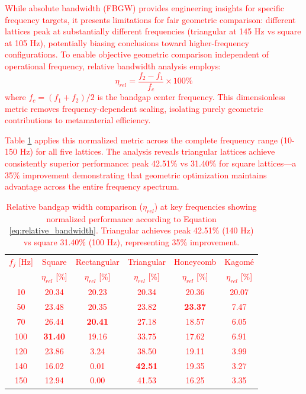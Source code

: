 \documentclass[review,numbers,sort&compress]{elsarticle}
\begin{document}
\textcolor{red}{While absolute bandwidth (FBGW) provides engineering insights for specific frequency targets, it presents limitations for fair geometric comparison: different lattices peak at substantially different frequencies (triangular at 145 Hz vs square at 105 Hz), potentially biasing conclusions toward higher-frequency configurations. To enable objective geometric comparison independent of operational frequency, relative bandwidth analysis employs:
\begin{equation}
\eta_{rel} = \frac{f_2 - f_1}{f_c} \times 100\%
\label{eq:relative_bandwidth}
\end{equation}
where $f_c = (f_1 + f_2)/2$ is the bandgap center frequency. This dimensionless metric removes frequency-dependent scaling, isolating purely geometric contributions to metamaterial efficiency.}

\textcolor{red}{Table \ref{tab:relative_bandwidth_comparison} applies this normalized metric across the complete frequency range (10-150 Hz) for all five lattices. The analysis reveals triangular lattices achieve consistently superior performance: peak 42.51\% vs 31.40\% for square lattices—a 35\% improvement demonstrating that geometric optimization maintains advantage across the entire frequency spectrum.}

\begin{table}[htb]
\centering
\caption{\textcolor{red}{Relative bandgap width comparison ($\eta_{rel}$) at key frequencies showing normalized performance according to Equation \ref{eq:relative_bandwidth}. Triangular achieves peak 42.51\% (140 Hz) vs square 31.40\% (100 Hz), representing 35\% improvement.}}
\label{tab:relative_bandwidth_comparison}
\textcolor{red}{
\footnotesize
\begin{tabular}{cccccc}
\hline
$f_j$ [Hz] & Square & Rectangular & Triangular & Honeycomb & Kagomé \\
& $\eta_{rel}$ [\%] & $\eta_{rel}$ [\%] & $\eta_{rel}$ [\%] & $\eta_{rel}$ [\%] & $\eta_{rel}$ [\%] \\
\hline
10 & 20.34 & 20.23 & 20.34 & 20.36 & 20.07 \\
50 & 23.48 & 20.35 & 23.82 & \textbf{23.37} & 7.47 \\
70 & 26.44 & \textbf{20.41} & 27.18 & 18.57 & 6.05 \\
100 & \textbf{31.40} & 19.16 & 33.75 & 17.62 & 6.91 \\
120 & 23.86 & 3.24 & 38.50 & 19.11 & 3.99 \\
140 & 16.02 & 0.01 & \textbf{42.51} & 19.35 & 3.27 \\
150 & 12.94 & 0.00 & 41.53 & 16.25 & 3.35 \\
\hline
\end{tabular}
}
\end{table}
\end{document}
